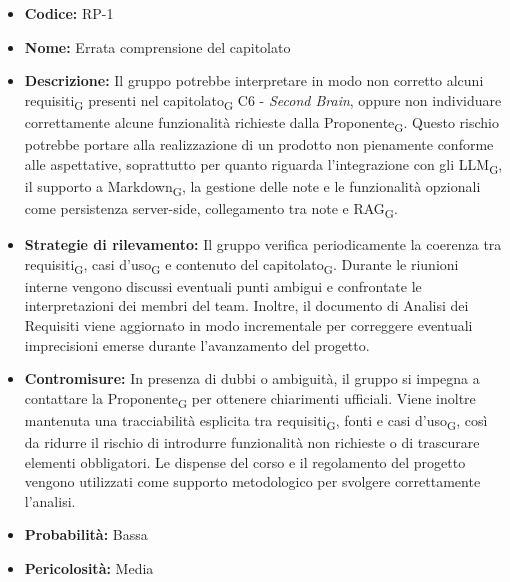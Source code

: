 ﻿\documentclass[a4paper, 10pt, colorlinks=true, linkcolor=black, urlcolor=blue, citecolor=blue, hidelinks]{article}
\begin{document}
\begin{itemize}
    \item \textbf{Codice:} RP-1

    \item \textbf{Nome:} Errata comprensione del capitolato

    \item \textbf{Descrizione:} Il gruppo potrebbe interpretare in modo non corretto alcuni requisiti\textsubscript{G} presenti nel capitolato\textsubscript{G} C6 - \textit{Second Brain}, oppure non individuare correttamente alcune funzionalità richieste dalla Proponente\textsubscript{G}. Questo rischio potrebbe portare alla realizzazione di un prodotto non pienamente conforme alle aspettative, soprattutto per quanto riguarda l'integrazione con gli LLM\textsubscript{G}, il supporto a Markdown\textsubscript{G}, la gestione delle note e le funzionalità opzionali come persistenza server-side, collegamento tra note e RAG\textsubscript{G}.

    \item \textbf{Strategie di rilevamento:} Il gruppo verifica periodicamente la coerenza tra requisiti\textsubscript{G}, casi d'uso\textsubscript{G} e contenuto del capitolato\textsubscript{G}. Durante le riunioni interne vengono discussi eventuali punti ambigui e confrontate le interpretazioni dei membri del team. Inoltre, il documento di Analisi dei Requisiti viene aggiornato in modo incrementale per correggere eventuali imprecisioni emerse durante l'avanzamento del progetto.

    \item \textbf{Contromisure:} In presenza di dubbi o ambiguità, il gruppo si impegna a contattare la Proponente\textsubscript{G} per ottenere chiarimenti ufficiali. Viene inoltre mantenuta una tracciabilità esplicita tra requisiti\textsubscript{G}, fonti e casi d'uso\textsubscript{G}, così da ridurre il rischio di introdurre funzionalità non richieste o di trascurare elementi obbligatori. Le dispense del corso e il regolamento del progetto vengono utilizzati come supporto metodologico per svolgere correttamente l'analisi.

    \item \textbf{Probabilità:} Bassa

    \item \textbf{Pericolosità:} Media
\end{itemize}
\end{document}
